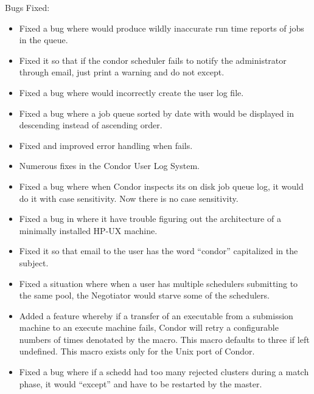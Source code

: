 \noindent Bugs Fixed:
\begin{itemize}

\item Fixed a bug where  would produce wildly inaccurate run time
reports of jobs in the queue.

\item Fixed it so that if the condor scheduler fails to notify the
administrator through email, just print a warning and do not except.

\item Fixed a bug where  would incorrectly create the user
log file.

\item Fixed a bug where a job queue sorted by date with  would
be displayed in descending instead of ascending order.

\item Fixed and improved error handling when  fails.

\item Numerous fixes in the Condor User Log System.

\item Fixed a bug where when Condor inspects its on disk job queue log,
it would do it with case sensitivity. Now there is no case sensitivity.

\item Fixed a bug in  where it have trouble figuring out
the architecture of a minimally installed HP-UX machine.

\item Fixed it so that email to the user has the word ``condor'' capitalized
in the subject.

\item Fixed a situation where when a user has multiple schedulers submitting
to the same pool, the Negotiator would starve some of the schedulers.

\item Added a feature whereby if a transfer of an executable
from a submission machine to an execute machine fails, Condor
will retry a configurable numbers of times denotated by the
 macro. This macro defaults to three if
left undefined. This macro exists only for the Unix port of Condor.

\item Fixed a bug where if a schedd had too many rejected clusters during a
match phase, it would ``except'' and have to be restarted by the master.

\end{itemize}

